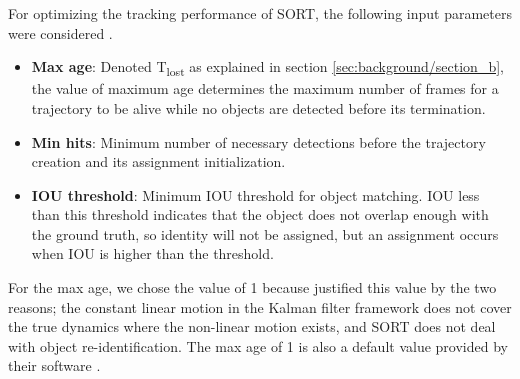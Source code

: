 For optimizing the tracking performance of SORT, the following input parameters were considered \cite{bewley_simple_2016}.
\begin{itemize}
    \item \textbf{Max age}: Denoted T\textsubscript{lost} as explained in section \ref{sec:background/section_b}, the value of maximum age determines the maximum number of frames for a trajectory to be alive while no objects are detected before its termination.
    \item \textbf{Min hits}: Minimum number of necessary detections before the trajectory creation and its assignment initialization.
    \item \textbf{IOU threshold}: Minimum IOU threshold for object matching. IOU less than this threshold indicates that the object does not overlap enough with the ground truth, so identity will not be assigned, but an assignment occurs when IOU is higher than the threshold.
\end{itemize}
For the max age, we chose the value of 1 because \citeauthor{bewley_simple_2016} \cite{bewley_simple_2016} justified this value by the two reasons; the constant linear motion in the Kalman filter framework does not cover the true dynamics where the non-linear motion exists, and SORT does not deal with object re-identification. The max age of 1 is also a default value provided by their software \cite{abewley_abewleysort_2021}. 

